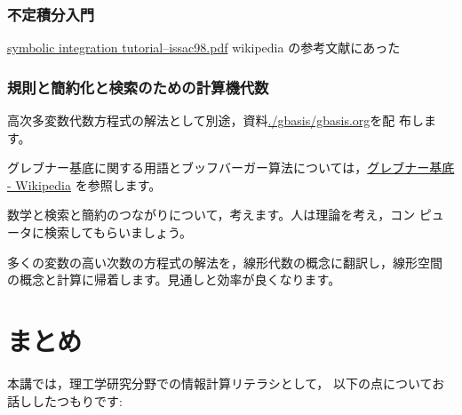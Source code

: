 \documentclass[dvipdfmx,11pat]{jarticle}
\begin{document}
\subsubsection{不定積分入門}
\label{sec:org4c552c2}
\href{http://www-sop.inria.fr/cafe/Manuel.Bronstein/publications/issac98.pdf}{symbolic integration tutorial--issac98.pdf}
wikipedia の参考文献にあった
\subsubsection{規則と簡約化と検索のための計算機代数}
\label{sec:org1c1b0b3}

高次多変数代数方程式の解法として別途，資料\url{./gbasis/gbasis.org}を配
布します。

グレブナー基底に関する用語とブッフバーガー算法については，\href{https://ja.wikipedia.org/wiki/\%E3\%82\%B0\%E3\%83\%AC\%E3\%83\%96\%E3\%83\%8A\%E3\%83\%BC\%E5\%9F\%BA\%E5\%BA\%95}{グレブナー基底 - Wikipedia} 
を参照します。

数学と検索と簡約のつながりについて，考えます。人は理論を考え，コン
ピュータに検索してもらいましょう。

多くの変数の高い次数の方程式の解法を，線形代数の概念に翻訳し，線形空間
の概念と計算に帰着します。見通しと効率が良くなります。
\section{まとめ}
\label{sec:org4d395b9}
本講では，理工学研究分野での情報計算リテラシとして，
以下の点についてお話ししたつもりです:
\end{document}
